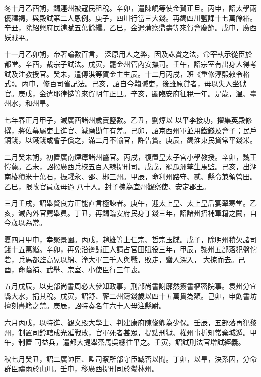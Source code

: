 \begin{pinyinscope}
 冬十月乙酉朔，蠲連州被寇民租稅。辛卯，遣陳峴等使金賀正旦。丙申，詔太學兩優釋褐，與殿試第二人恩例。庚子，四川行當三大錢。再蠲四川鹽課十七萬餘緡。辛丑，除紹興府民逋賦五萬餘緡。乙巳，金遣蒲察鼎壽等來賀會慶節。戊申，廣西妖賊平。



 十一月乙卯朔，帝著論數百言，
 深原用人之弊，因及誅賞之法，命宰執示從臣於都堂。辛酉，裁宗子試法。戊寅，罷金州管內安撫司。壬午，詔宗室有出身人得考試及注教授官。癸未，遣傅淇等賀金主生辰。十二月丙戌，班《重修淳熙敕令格式》。丙申，修百司省記法。己亥，詔自今鞫贓吏，後雖原貸者，毋以失入坐獄官。庚戌，金遣耶律慥等來賀明年正旦。辛亥，蠲臨安府征稅一年。是歲，溫、臺州水，和州旱。



 七年春正月甲子，減廣西諸州歲賣鹽數。乙丑，劉焞以
 以平李接功，擢集英殿修撰，將佐幕屬吏士進官、減磨勘年有差。己卯，詔京西州軍並用鐵錢及會子；民戶銅錢，以鐵錢或會子償之，滿二月不輸官，許告賞。庚辰，蠲淮東民貸常平錢米。



 二月癸未朔，初置廣南煙瘴諸州醫官。丙戌，復置皇太子宮小學教授。辛卯，魏王愷薨。乙未，詔撥廣西兵校五百人隸提刑司。戊戌，罷瓜洲孳生馬監。己亥，出湖南樁積米十萬石，振糶永、邵、郴三州。甲辰，命利州路守、貳、縣令兼領營田。乙巳，限改官員歲毋過
 八十人。封子楝為宜州觀察使、安定郡王。



 三月壬戌，詔舉賢良方正能直言極諫者。庚午，迎太上皇、太上皇后宴翠寒堂。乙亥，減內外官薦舉員。丁丑，再蠲臨安府民身丁錢三年，詔諸州招補軍籍之闕，自今歲以為常。



 夏四月甲申，幸聚景園。丙戌，趙雄等上仁宗、哲宗玉牒。戊子，除明州積欠諸司錢十五萬緡。辛卯，再免沿邊歸正人請占官田賦役三年，甲辰，黎州五部落犯盤佗砦，兵馬都監高晃以綿、潼大軍三千人與戰，敗走，蠻人深入，
 大掠而去。己酉，命蔭補、武舉、宗室、小使臣行三年喪。



 五月戊辰，以吏部尚書周必大參知政事，刑部尚書謝廓然簽書樞密院事。袁州分宜縣大水，捐其稅。戊寅，詔舒、蘄二州鑄錢歲以四十五萬貫為額。己卯，申飭書坊擅刻書籍之禁。庚辰，詔特奏名年六十人毋注縣尉。



 六月丙戌，以特進、觀文殿大學士、判建康府陳俊卿為少保。壬辰，五部落再犯黎州，制置司鈐轄成光延戰敗，官軍死者甚眾，提點刑獄、權州事折知常棄城遁。甲午，制置
 司益兵，遣都大提舉茶馬吳總往平之。壬寅，詔試刑法官增試經義。



 秋七月癸丑，詔二廣帥臣、監司察所部守臣臧否以聞。丁卯，以旱，決系囚，分命群臣禱雨於山川。壬申，移廣西提刑司於鬱林州。




\end{pinyinscope}

